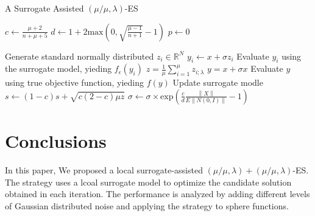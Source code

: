 


\begin{algorithm}
\caption{A Surrogate Assisted $(\mu/\mu,\lambda)$-ES}
\label{alg}
\begin{algorithmic}[1]
\STATE $c \leftarrow  \frac{\mu +2}{n+\mu+5}$ 
\STATE $d \leftarrow 1 + 2 \text{max}(0, \sqrt{\frac{\mu - 1}{n+1} } - 1 ) $
\STATE $p \leftarrow 0$

		\STATE Generate standard normally distributed $z_i \in \mathbb{R}^N $
		\STATE $y_i \leftarrow x + \sigma z_i$
		\STATE Evaluate $y_i$ using the surrogate model, yieding $f_{\epsilon}(y_i)$
	\ENDFOR
	\STATE $z = \frac{1}{\mu} \sum_{i=1}^{\mu} z_{i;\lambda}$
	\STATE $y = x + \sigma x$
	\STATE Evaluate $y$ using true objective function, yieding $f(y)$
	\STATE Update surrogate modle 
	\STATE $s \leftarrow (1-c)s + \sqrt{ c(2-c) \mu z}$
	\STATE $\sigma \leftarrow \sigma \times \text{exp} \left(\frac{c}{d} \frac{\left\lVert X \right\rVert} { E \left\lVert N(0,I) \right\rVert} -1 \right )$
		

\ENDWHILE

\end{algorithmic}
\end{algorithm}



\section{Conclusions}
In this paper, We proposed a local surrogate-assisted $(\mu/\mu,\lambda)+(\mu/\mu,\lambda)$-ES. The strategy uses a lcoal surrogate model to optimize the candidate solution obtained in each iteration. The performance is analyzed by adding different levels of Gaussian distributed noise and applying the strategy to sphere functions. 

